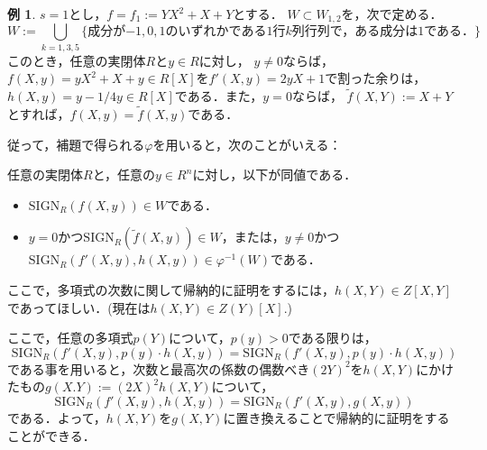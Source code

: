 \documentclass[uplatex, dvipdfmx]{jsarticle}
\newcommand{\SIGN}{\mathrm{SIGN}}
\theoremstyle{definition}
\newtheorem*{example*}{例}
\begin{document}
\begin{example*}
$s=1$とし，$f = f_1 := YX^2 + X + Y$とする．
$W \subset W_{1,2}$を，次で定める．
\begin{equation}
    W:=  \bigcup_{k=1,3,5}\{\text{成分が$-1,0,1$のいずれかである$1$行$k$列行列で，ある成分は1である．}\}
\end{equation}
このとき，任意の実閉体$R$と$y \in R$に対し，
$y \neq 0$ならば，
$f(X,y) = yX^2 + X + y \in R[X]$を$f'(X,y) = 2yX + 1$で割った余りは，
$h(X,y) = y-1/4y \in R[X]$である．また，$y = 0$ならば，
$\widetilde{f}(X,Y) := X + Y$とすれば，$f(X,y) = \widetilde{f}(X,y)$である．

従って，補題で得られる$\varphi$を用いると，次のことがいえる：

任意の実閉体$R$と，任意の$y \in R^n$に対し，以下が同値である．
\begin{itemize}
    \item $\SIGN_R(f(X,y)) \in W$である．\\
    \item $y = 0$かつ$\SIGN_R(\widetilde{f}(X,y)) \in W$，または，$y \neq 0$かつ$\SIGN_R(f'(X,y), h(X,y)) \in \varphi^{-1}(W)$である．
\end{itemize}

ここで，多項式の次数に関して帰納的に証明をするには，$h(X,Y) \in Z[X, Y]$であってほしい．(現在は$h(X,Y) \in Z(Y)[X]$.)

ここで，任意の多項式$p(Y)$について，$p(y)>0$である限りは，
\begin{equation}
    \SIGN_R(f'(X,y), p(y)\cdot h(X,y)) = \SIGN_R(f'(X,y), p(y)\cdot h(X,y))
\end{equation}
である事を用いると，次数と最高次の係数の偶数べき$(2Y)^2$を$h(X,Y)$にかけたもの$g(X.Y) := (2X)^2 h(X,Y)$について，
\begin{equation}
    \SIGN_R(f'(X,y), h(X,y)) = \SIGN_R(f'(X,y), g(X,y))
\end{equation}
である．よって，$h(X,Y)$を$g(X,Y)$に置き換えることで帰納的に証明をすることができる．
\end{example*}
\end{document}
